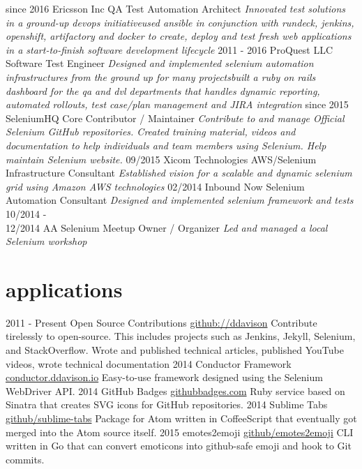 \documentclass[]{ddavison-resume}
\begin{document}
\begin{entrylist}
  \entry
         {since 2016}
         {Ericsson Inc}
         {QA Test Automation Architect}
         {\emph{Innovated test solutions in a ground-up devops initiative\bullet used ansible in conjunction with rundeck, jenkins, openshift, artifactory and docker to create, deploy and test fresh web applications in a start-to-finish software development lifecycle}}
  \entry
  	{2011 - 2016}
  	{ProQuest LLC}
  	{Software Test Engineer}
  	{\emph{Designed and implemented selenium automation infrastructures from the ground up for many projects\bullet built a ruby on rails dashboard for the qa and dvl departments that handles dynamic reporting, automated rollouts, test case/plan management and JIRA integration}} 
  \entry
  	{since 2015}
  	{SeleniumHQ}
  	{Core Contributor / Maintainer}
  	{\emph{Contribute to and manage Official Selenium GitHub repositories. Created training material, videos and documentation to help individuals and team members using Selenium.  Help maintain Selenium website.}}
  \entry
  	{09/2015}
  	{Xicom Technologies}
  	{AWS/Selenium Infrastructure Consultant}
  	{\emph{Established vision for a scalable and dynamic selenium grid using Amazon AWS technologies}}
  \entry
  	{02/2014}
  	{Inbound Now}
  	{Selenium Automation Consultant}
  	{\emph{Designed and implemented selenium framework and tests}}
  \entry
  	{10/2014 - \\
  	12/2014}
  	{AA Selenium Meetup}
  	{Owner / Organizer}
  	{\emph{Led and managed a local Selenium workshop}}
\end{entrylist}

\section{applications}

\begin{entrylist}
  \entry
    {2011 - Present}
    {Open Source Contributions}
    {\href{https://github.com/ddavison}{github://ddavison}}
    {Contribute tirelessly to open-source.  This includes projects such as Jenkins, Jekyll, Selenium, and StackOverflow. Wrote and published technical articles, published YouTube videos, wrote technical documentation}
  \entry
    {2014}
    {Conductor Framework}
    {\href{https://conductor.ddavison.io}{conductor.ddavison.io}}
    {Easy-to-use framework designed using the Selenium WebDriver API.}
  \entry
    {2014}
    {GitHub Badges}
    {\href{https://github.com/ddavison/github-badges}{githubbadges.com}}
    {Ruby service based on Sinatra that creates SVG icons for GitHub repositories.}
  \entry
    {2014}
    {Sublime Tabs}
    {\href{https://github.com/ddavison/sublime-tabs}{github/sublime-tabs}}
    {Package for Atom written in CoffeeScript that eventually got merged into the Atom source itself.}
  \entry
  	{2015}
  	{emotes2emoji}
  	{\href{https://github.com/ddavison/emotes2emoji}{github/emotes2emoji}}
  	{CLI written in Go that can convert emoticons  into github-safe emoji and hook to Git commits.}
\end{entrylist}
\end{document}

